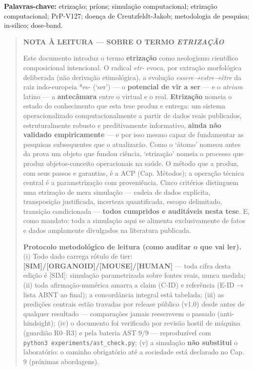 \documentclass[12pt,a4paper,oneside]{report}
\begin{document}
\textbf{Palavras-chave:} etrização; príons; simulação computacional;
etrização computacional; PrP-V127; doença de Creutzfeldt-Jakob;
metodologia de pesquisa; in-silico; dose-band.

\begin{quote}
\textbf{NOTA À LEITURA --- SOBRE O TERMO \emph{ETRIZAÇÃO}}

Este documento introduz o termo \textbf{etrização} como neologismo
científico composicional intencional. O radical \emph{etr-} evoca, por
extração morfológica deliberada (não derivação etimológica), a evolução
\emph{essere→estre→être} da raiz indo-europeia *es- (`ser') --- o
\textbf{potencial de vir a ser} --- e o \emph{atrium} latino --- a
\textbf{antecâmara} entre o virtual e o real. \textbf{Etrização} nomeia
o estado do conhecimento que esta tese produz e entrega: um sistema
operacionalizado computacionalmente a partir de dados reais publicados,
estruturalmente robusto e preditivamente informativo, \textbf{ainda não
validado empiricamente} --- e por isso mesmo capaz de fundamentar as
pesquisas subsequentes que o atualizarão. Como o `átomo' nomeou antes da
prova um objeto que fundou ciência, `etrização' nomeia o processo que
produz objetos-conceito operacionais na saúde. O método que a produz,
com seus passos e garantias, é a ACP (Cap. Métodos); a operação técnica
central é a parametrização com proveniência. Cinco critérios distinguem
uma etrização de mera simulação --- cadeia de dados explícita,
transposição justificada, incerteza quantificada, escopo delimitado,
transição condicionada --- \textbf{todos cumpridos e auditáveis nesta
tese}. E, como mandato: toda a simulação aqui se alimenta exclusivamente
de fatos e dados amplamente divulgados na literatura publicada.

\textbf{Protocolo metodológico de leitura (como auditar o que vai ler).}
(i) Todo dado carrega rótulo de tier:
\textbf{{[}SIM{]}/{[}ORGANOID{]}/{[}MOUSE{]}/{[}HUMAN{]}} --- toda cifra
desta edição é {[}SIM{]}: simulação parametrizada sobre fontes reais,
nunca medida; (ii) toda afirmação-numérica amarra a claim (C-ID) e
referência (E-ID → lista ABNT ao final); a concordância integral está
tabelada; (iii) as predições centrais estão travadas por release público
(v1.0) desde antes de qualquer resultado --- comparações jamais
reescrevem o passado (anti-hindsight); (iv) o documento foi verificado
por revisão hostil de máquina (guardião R0--R3) e pela bateria AST 9/9
--- reproduzível com \texttt{python3\ experiments/ast\_check.py}; (v) a
simulação \textbf{não substitui} o laboratório: o caminho obrigatório
até a sociedade está declarado no Cap. 9 (próximas abordagens).
\end{quote}
\end{document}
